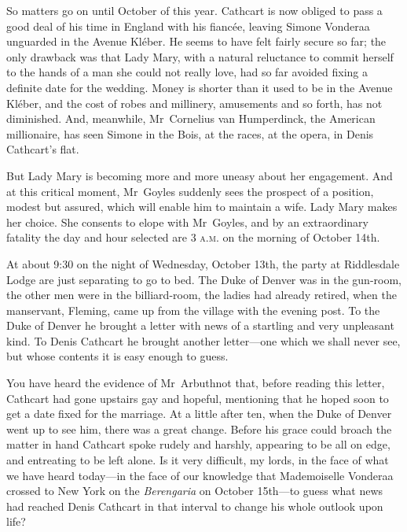 \begin{dialogue}
\smallskip 

So matters go on until October of this year. Cathcart is now obliged to pass a good deal of his time in England with his fiancée, leaving Simone Vonderaa unguarded in the Avenue Kléber. He seems to have felt fairly secure so far; the only drawback was that Lady Mary, with a natural reluctance to commit herself to the hands of a man she could not really love, had so far avoided fixing a definite date for the wedding. Money is shorter than it used to be in the Avenue Kléber, and the cost of robes and millinery, amusements and so forth, has not diminished. And, meanwhile, Mr~Cornelius van Humperdinck, the American millionaire, has seen Simone in the Bois, at the races, at the opera, in Denis Cathcart's flat.

\smallskip 

But Lady Mary is becoming more and more uneasy about her engagement. And at this critical moment, Mr~Goyles suddenly sees the prospect of a position, modest but assured, which will enable him to maintain a wife. Lady Mary makes her choice. She consents to elope with Mr~Goyles, and by an extraordinary fatality the day and hour selected are 3 \textsc{a.m.} on the morning of October 14th.

\smallskip 

At about 9:30 on the night of Wednesday, October 13th, the party at Riddlesdale Lodge are just separating to go to bed. The Duke of Denver was in the gun-room, the other men were in the billiard-room, the ladies had already retired, when the manservant, Fleming, came up from the village with the evening post. To the Duke of Denver he brought a letter with news of a startling and very unpleasant kind. To Denis Cathcart he brought another letter—one which we shall never see, but whose contents it is easy enough to guess.

\smallskip 

You have heard the evidence of Mr~Arbuthnot that, before reading this letter, Cathcart had gone upstairs gay and hopeful, mentioning that he hoped soon to get a date fixed for the marriage. At a little after ten, when the Duke of Denver went up to see him, there was a great change. Before his grace could broach the matter in hand Cathcart spoke rudely and harshly, appearing to be all on edge, and entreating to be left alone. Is it very difficult, my lords, in the face of what we have heard today—in the face of our knowledge that Mademoiselle Vonderaa crossed to New York on the \textit{Berengaria} on October 15th—to guess what news had reached Denis Cathcart in that interval to change his whole outlook upon life?


\end{dialogue}
